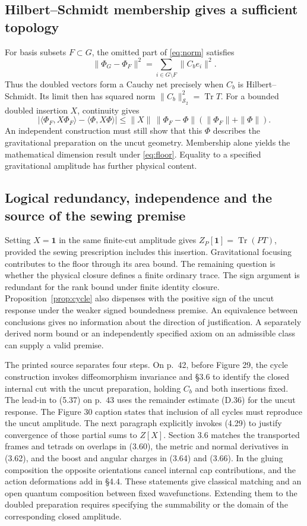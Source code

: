 \documentclass[11pt]{article}
\newcommand{\Tr}{\operatorname{Tr}}
\newcommand{\id}{\mathbf{1}}
\newcommand{\HS}{\mathcal S_2}
\begin{document}
\subsection{Hilbert--Schmidt membership gives a sufficient topology}
For basis subsets $F\subset G$, the omitted part of \eqref{eq:norm} satisfies
\[
 \|\Phi_G-\Phi_F\|^2=\sum_{i\in G\setminus F}\|C_b e_i\|^2.
\]
Thus the doubled vectors form a Cauchy net precisely when $C_b$ is Hilbert--Schmidt. Its limit then has squared norm $\|C_b\|_{\HS}^2=\Tr T$. For a bounded doubled insertion $X$, continuity gives
\[
 |\langle\Phi_F,X\Phi_F\rangle-\langle\Phi,X\Phi\rangle|
 \le \|X\|\,\|\Phi_F-\Phi\|(\|\Phi_F\|+\|\Phi\|).
\]
An independent construction must still show that this $\Phi$ describes the gravitational preparation on the uncut geometry. Membership alone yields the mathematical dimension result under \eqref{eq:floor}. Equality to a specified gravitational amplitude has further physical content.

\subsection{Logical redundancy, independence and the source of the sewing premise}\label{sec:sewing}
Setting $X=\id$ in the same finite-cut amplitude gives $Z_P[\id]=\Tr(PT)$, provided the sewing prescription includes this insertion. Gravitational focusing contributes to the floor through its area bound. The remaining question is whether the physical closure defines a finite ordinary trace. The sign argument is redundant for the rank bound under finite identity closure. Proposition~\ref{prop:cycle} also dispenses with the positive sign of the uncut response under the weaker signed boundedness premise. An equivalence between conclusions gives no information about the direction of justification. A separately derived norm bound or an independently specified axiom on an admissible class can supply a valid premise.

The printed source separates four steps. On p.~42, before Figure 29, the cycle construction invokes diffeomorphism invariance and \S3.6 to identify the closed internal cut with the uncut preparation, holding $C_b$ and both insertions fixed. The lead-in to (5.37) on p.~43 uses the remainder estimate (D.36) for the uncut response. The Figure 30 caption states that inclusion of all cycles must reproduce the uncut amplitude. The next paragraph explicitly invokes (4.29) to justify convergence of those partial sums to $Z[X]$. Section 3.6 matches the transported frames and tetrads on overlaps in (3.60), the metric and normal derivatives in (3.62), and the boost and angular charges in (3.64) and (3.66). In the gluing composition the opposite orientations cancel internal cap contributions, and the action deformations add in \S4.4. These statements give classical matching and an open quantum composition between fixed wavefunctions. Extending them to the doubled preparation requires specifying the summability or the domain of the corresponding closed amplitude.
\end{document}
